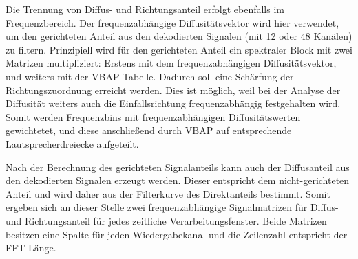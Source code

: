 

Die Trennung von Diffus- und Richtungsanteil erfolgt ebenfalls im Frequenzbereich. Der frequenzabhängige Diffusitätsvektor wird hier verwendet, um den gerichteten Anteil aus den dekodierten Signalen (mit 12 oder 48 Kanälen) zu filtern. Prinzipiell wird für den gerichteten Anteil ein spektraler Block mit zwei Matrizen multipliziert: Erstens mit dem frequenzabhängigen Diffusitätsvektor, und weiters mit der VBAP-Tabelle. Dadurch soll eine Schärfung der Richtungszuordnung erreicht werden. Dies ist möglich, weil bei der Analyse der Diffusität weiters auch die Einfallsrichtung frequenzabhängig festgehalten wird. Somit werden Frequenzbins mit frequenzabhängigen Diffusitätswerten gewichtetet, und diese anschließend durch VBAP auf entsprechende Lautsprecherdreiecke aufgeteilt.

Nach der Berechnung des gerichteten Signalanteils kann auch der Diffusanteil aus den dekodierten Signalen erzeugt werden. Dieser entspricht dem nicht-gerichteten Anteil und wird daher aus der Filterkurve des Direktanteils bestimmt. Somit ergeben sich an dieser Stelle zwei frequenzabhängige Signalmatrizen für Diffus- und Richtungsanteil für jedes zeitliche Verarbeitungsfenster. Beide Matrizen besitzen eine Spalte für jeden Wiedergabekanal und die Zeilenzahl entspricht der FFT-Länge.